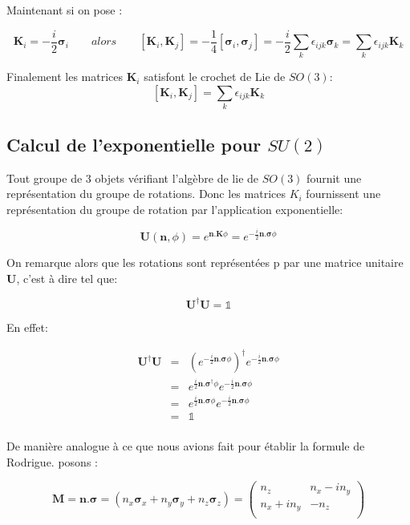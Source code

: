 \documentclass[12pt,a4paper]{article}
\newcommand{\unit}
{
\bm{\mathds{1}}
}
\begin{document}
	Maintenant si on pose :
	
	\[
		\boxed{\bm{K}_i=-\frac{i}{2}\bm{\sigma}_i}
	\quad\quad alors \quad\quad
	[\bm{K}_i,\bm{K}_j]=-\frac{1}{4}[\bm{\sigma}_i,\bm{\sigma}_j]=-\frac{i}{2} \sum_k \epsilon_{ijk}\bm{\sigma}_k = \sum_k \epsilon_{ijk}\bm{K}_k
	\]
	
	Finalement les matrices $\bm{K}_i$ satisfont le crochet de Lie de $SO(3)$:
	\[
	\boxed{[\bm{K}_i,\bm{K}_j]= \sum_k \epsilon_{ijk}\bm{K}_k}
	\]
	
\newpage
\subsection{Calcul de l'exponentielle pour $SU(2)$}

Tout groupe de 3 objets vérifiant l'algèbre de lie de $SO(3)$ fournit une représentation du groupe de rotations. Donc les matrices $K_i$ fournissent une représentation du groupe de rotation par l'application exponentielle:

\[
\boxed{\bm{U}(\bm{n},\phi) = e^{\bm{n}.\bm{K} \phi}= e^{-\frac{i}{2}\bm{n}.\bm{\sigma} \phi}}
\]

On remarque alors que les rotations sont représentées p par une matrice unitaire $\bm{U}$, c'est à dire tel que:

\[
\boxed{\bm{U}^{\dagger}\bm{U}=\unit}
\] 

En effet:

\begin{eqnarray*}
\bm{U}^{\dagger}\bm{U}&=&\left(e^{-\frac{i}{2}\bm{n}.\bm{\sigma} \phi}\right)^\dagger e^{-\frac{i}{2}\bm{n}.\bm{\sigma} \phi}\\
&=&e^{\frac{i}{2}\bm{n}.\bm{\bm{\sigma}^\dagger} \phi} e^{-\frac{i}{2}\bm{n}.\bm{\sigma} \phi}\\
&=&e^{\frac{i}{2}\bm{n}.\bm{\sigma} \phi} e^{-\frac{i}{2}\bm{n}.\bm{\sigma} \phi}\\
&=&\unit\\
\end{eqnarray*}

De manière analogue à ce que nous avions fait pour établir la formule de Rodrigue. posons :

\[
	\bm{M}=\bm{n}.\bm{\sigma}=(n_x \bm{\sigma}_x+n_y \bm{\sigma}_y+n_z \bm{\sigma}_z)= \begin{pmatrix}
	n_z&n_x-i n_y\\
	n_x+i n_y&-n_z\\
	\end{pmatrix}
\]
\end{document}
